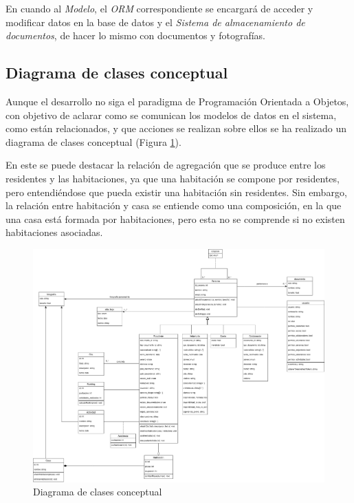 En cuando al \textit{Modelo}, el \textit{ORM} correspondiente se encargará de acceder y modificar datos en la base de datos y el \textit{Sistema de almacenamiento de documentos}, de hacer lo mismo con documentos y fotografías.   

\subsection{Diagrama de clases conceptual}

Aunque el desarrollo no siga el paradigma de Programación Orientada a Objetos, con objetivo de aclarar como se comunican los modelos de datos en el sistema, como están relacionados, y que acciones se realizan sobre ellos se ha realizado un diagrama de clases conceptual (Figura \ref{fig:dc}). 

En este se puede destacar la relación de agregación que se produce entre los residentes y las habitaciones, ya que una habitación se compone por residentes, pero entendiéndose que pueda existir una habitación sin residentes. Sin embargo, la relación entre habitación y casa se entiende como una composición, en la que una casa está formada por habitaciones, pero esta no se comprende si no existen habitaciones asociadas.

\begin{figure}[h!]
    \centering
    \includegraphics[width=\textwidth]{diseno/sistema/DiagramaDeClases.png}
    \caption{Diagrama de clases conceptual}
    \label{fig:dc}
\end{figure}

